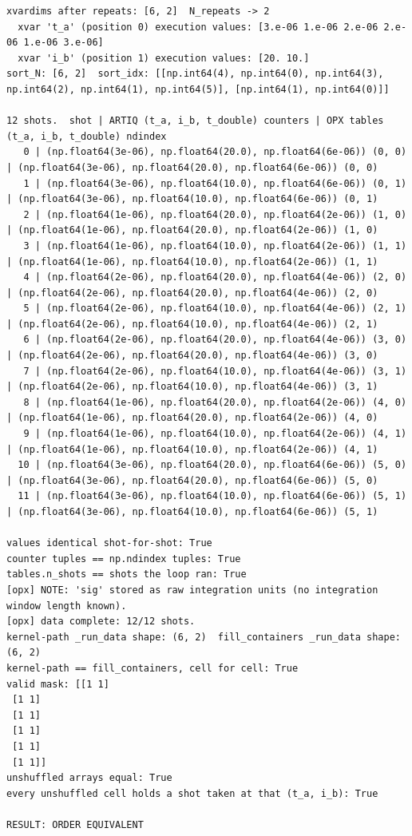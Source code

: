 \begin{lstlisting}[style=txt]
xvardims after repeats: [6, 2]  N_repeats -> 2
  xvar 't_a' (position 0) execution values: [3.e-06 1.e-06 2.e-06 2.e-06 1.e-06 3.e-06]
  xvar 'i_b' (position 1) execution values: [20. 10.]
sort_N: [6, 2]  sort_idx: [[np.int64(4), np.int64(0), np.int64(3), np.int64(2), np.int64(1), np.int64(5)], [np.int64(1), np.int64(0)]]

12 shots.  shot | ARTIQ (t_a, i_b, t_double) counters | OPX tables (t_a, i_b, t_double) ndindex
   0 | (np.float64(3e-06), np.float64(20.0), np.float64(6e-06)) (0, 0) | (np.float64(3e-06), np.float64(20.0), np.float64(6e-06)) (0, 0)
   1 | (np.float64(3e-06), np.float64(10.0), np.float64(6e-06)) (0, 1) | (np.float64(3e-06), np.float64(10.0), np.float64(6e-06)) (0, 1)
   2 | (np.float64(1e-06), np.float64(20.0), np.float64(2e-06)) (1, 0) | (np.float64(1e-06), np.float64(20.0), np.float64(2e-06)) (1, 0)
   3 | (np.float64(1e-06), np.float64(10.0), np.float64(2e-06)) (1, 1) | (np.float64(1e-06), np.float64(10.0), np.float64(2e-06)) (1, 1)
   4 | (np.float64(2e-06), np.float64(20.0), np.float64(4e-06)) (2, 0) | (np.float64(2e-06), np.float64(20.0), np.float64(4e-06)) (2, 0)
   5 | (np.float64(2e-06), np.float64(10.0), np.float64(4e-06)) (2, 1) | (np.float64(2e-06), np.float64(10.0), np.float64(4e-06)) (2, 1)
   6 | (np.float64(2e-06), np.float64(20.0), np.float64(4e-06)) (3, 0) | (np.float64(2e-06), np.float64(20.0), np.float64(4e-06)) (3, 0)
   7 | (np.float64(2e-06), np.float64(10.0), np.float64(4e-06)) (3, 1) | (np.float64(2e-06), np.float64(10.0), np.float64(4e-06)) (3, 1)
   8 | (np.float64(1e-06), np.float64(20.0), np.float64(2e-06)) (4, 0) | (np.float64(1e-06), np.float64(20.0), np.float64(2e-06)) (4, 0)
   9 | (np.float64(1e-06), np.float64(10.0), np.float64(2e-06)) (4, 1) | (np.float64(1e-06), np.float64(10.0), np.float64(2e-06)) (4, 1)
  10 | (np.float64(3e-06), np.float64(20.0), np.float64(6e-06)) (5, 0) | (np.float64(3e-06), np.float64(20.0), np.float64(6e-06)) (5, 0)
  11 | (np.float64(3e-06), np.float64(10.0), np.float64(6e-06)) (5, 1) | (np.float64(3e-06), np.float64(10.0), np.float64(6e-06)) (5, 1)

values identical shot-for-shot: True
counter tuples == np.ndindex tuples: True
tables.n_shots == shots the loop ran: True
[opx] NOTE: 'sig' stored as raw integration units (no integration window length known).
[opx] data complete: 12/12 shots.
kernel-path _run_data shape: (6, 2)  fill_containers _run_data shape: (6, 2)
kernel-path == fill_containers, cell for cell: True
valid mask: [[1 1]
 [1 1]
 [1 1]
 [1 1]
 [1 1]
 [1 1]]
unshuffled arrays equal: True
every unshuffled cell holds a shot taken at that (t_a, i_b): True

RESULT: ORDER EQUIVALENT
\end{lstlisting}

